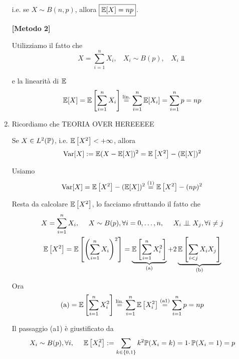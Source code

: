 \begin{enumerate}
i.e. se $X\sim B( n,p)$, allora $\boxed{\mathbb{E}[ X] =np}$.

\textbf{[Metodo 2]}

Utilizziamo il fatto che\begin{equation*}
X=\sum\limits _{i=1}^{n} X_{i} ,\ \ \ \ X_{i} \sim B( p) ,\ \ \ \ X_{i} \Bot 
\end{equation*}

e la linearità di $\mathbb{E}$\begin{equation*}
\mathbb{E}[ X] =\mathbb{E}\left[\sum\limits _{i=1}^{n} X_{i}\right]\overset{\text{lin.}}{=}\sum\limits _{i=1}^{n}\mathbb{E}[ X_{i}] =\sum\limits _{i=1}^{n} p=np
\end{equation*}
\item Ricordiamo che TEORIA OVER HEREEEEE

Se $X\in L^{2}(\mathbb{P})$, i.e. $\mathbb{E}\left[ X^{2}\right] < +\infty $, allora\begin{equation*}
\mathrm{Var}[ X] :=\mathbb{E}( X-\mathbb{E}[ X])^{2} =\mathbb{E}\left[ X^{2}\right] -(\mathbb{E}[ X])^{2}
\end{equation*}

Usiamo\begin{equation*}
\mathrm{Var}[ X] =\mathbb{E}\left[ X^{2}\right] -(\mathbb{E}[ X])^{2}\overset{( 1)}{=}\mathbb{E}\left[ X^{2}\right] -( np)^{2}
\end{equation*}

Resta da calcolare $\mathbb{E}\left[ X^{2}\right]$, lo facciamo sfruttando il fatto che\begin{gather*}
X=\sum\limits _{i=1}^{n} X_{i} ,\ \ \ \ X\sim B( p) ,\forall i=0,\dots ,n,\ \ \ \ X_{i} \perp \!\!\! \perp X_{j} ,\forall i\neq j\\
\mathbb{E}\left[ X^{2}\right] =\mathbb{E}\left[\left(\sum\limits _{i=1}^{n} X_{i}\right)^{2}\right] =\underbrace{\mathbb{E}\left[\sum\limits _{i=1}^{n} X_{i}^{2}\right]}_{\text{(a)}} +2\underbrace{\mathbb{E}\left[\sum\limits _{i< j} X_{i} X_{j}\right]}_{\text{(b)}}
\end{gather*}

Ora\begin{equation*}
\text{(a)} =\mathbb{E}\left[\sum\limits _{i=1}^{n} X_{i}^{2}\right]\overset{\text{lin.}}{=}\sum\limits _{i=1}^{n}\mathbb{E}\left[ X_{i}^{2}\right]\overset{\text{(a1)}}{=}\sum\limits _{i=1}^{n} p=np
\end{equation*}

Il passaggio (a1) è giustificato da\begin{equation*}
X_{i} \sim B( p) ,\forall i,\ \ \ \ \mathbb{E}\left[ X_{i}^{2}\right] :=\sum\limits _{k\in \{0,1\}} k^{2}\mathbb{P}( X_{i} =k) =1\cdotp \mathbb{P}( X_{i} =1) =p
\end{equation*}


\end{enumerate}
